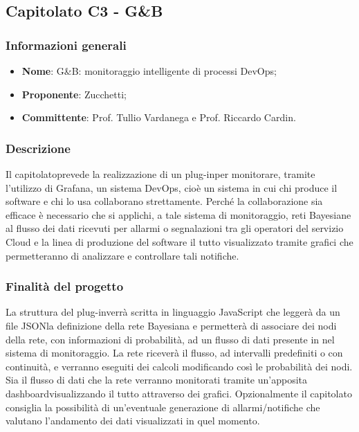 \subsection{Capitolato C3 - G\&B}
\subsubsection{Informazioni generali}
\begin{itemize}
	\item \textbf{Nome}: G\&B: monitoraggio intelligente di processi DevOps\glo;
	\item \textbf{Proponente}: Zucchetti;
	\item \textbf{Committente}: Prof. Tullio Vardanega e Prof. Riccardo Cardin.
\end{itemize}
\subsubsection{Descrizione}
Il capitolato\glosp prevede la realizzazione di un plug-in\glosp per monitorare, tramite l'utilizzo di Grafana\glo, un sistema DevOps\glo, cioè un sistema in cui chi produce il software e chi lo usa collaborano strettamente. Perché la collaborazione sia efficace è necessario che si applichi, a tale sistema di monitoraggio, reti Bayesiane al flusso dei dati ricevuti per allarmi o segnalazioni tra gli operatori del servizio Cloud e la linea di produzione del software il tutto visualizzato tramite grafici che permetteranno di analizzare e controllare tali notifiche.
\subsubsection{Finalità del progetto}
La struttura del plug-in\glosp verrà scritta in linguaggio JavaScript che leggerà da un file JSON\glosp la definizione della rete Bayesiana e permetterà di associare dei nodi della rete, con informazioni di probabilità, ad un flusso di dati presente in nel sistema di monitoraggio. La rete riceverà il flusso, ad intervalli predefiniti o con continuità, e verranno eseguiti dei calcoli modificando così le probabilità dei nodi. Sia il flusso di dati che la rete verranno monitorati tramite un'apposita dashboard\glosp visualizzando il tutto attraverso dei grafici. Opzionalmente il capitolato consiglia la possibilità di	un'eventuale generazione di allarmi/notifiche che valutano l'andamento dei dati visualizzati in quel momento.
